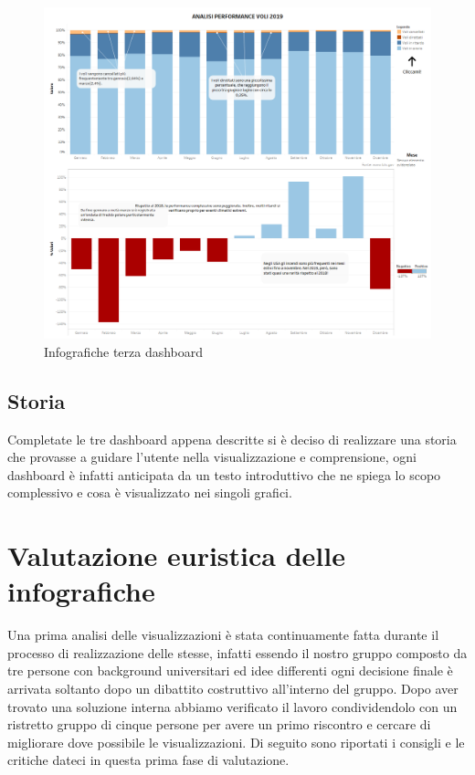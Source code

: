 \documentclass[12pt]{article}
\begin{document}
\begin{figure}[H]
    \hspace{-33pt}
    \includegraphics[scale = 0.53]{img/dashboard/Dashboard3.png}
    \caption{Infografiche terza dashboard}
\end{figure}

\subsection{Storia}
Completate le tre dashboard appena descritte si è deciso di realizzare una storia che provasse a guidare l'utente nella visualizzazione e comprensione, ogni dashboard è infatti anticipata da un testo introduttivo che ne spiega lo scopo complessivo e cosa è visualizzato nei singoli grafici.

\newpage
\section{Valutazione euristica delle infografiche}
Una prima analisi delle visualizzazioni è stata continuamente fatta durante il processo di realizzazione delle stesse, infatti essendo il nostro gruppo composto da tre persone con background universitari ed idee differenti ogni decisione finale è arrivata soltanto dopo un dibattito costruttivo all'interno del gruppo. Dopo aver trovato una soluzione interna abbiamo verificato il lavoro condividendolo con un ristretto gruppo di cinque persone per avere un primo riscontro e cercare di migliorare dove possibile le visualizzazioni. Di seguito sono riportati i consigli e le critiche dateci in questa prima fase di valutazione.
\end{document}
